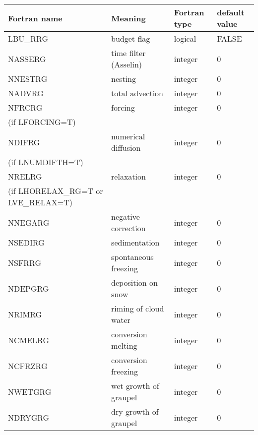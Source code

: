 \begin{center}
\begin{tabular} {|p{8cm}|p{4cm}|>{\centering}p{1.5cm}|p{1.5cm}<{\centering}|}
\hline
Fortran name & Meaning & Fortran type & default value \\
\hline\hline
LBU\_RRG & budget flag & logical & FALSE\index{LBU\_RRG!\innam{NAM\_BU\_RRG}} \\\hline
NASSERG  & time filter (Asselin)   & integer  &  0 \index{NASSERG!\innam{NAM\_BU\_RRG}} \\\hline
NNESTRG  & nesting           & integer  &  0 \index{NNESTRG!\innam{NAM\_BU\_RRG}} \\\hline
NADVRG   & total advection   & integer  &  0 \index{NADVRG!\innam{NAM\_BU\_RRG}}\\\hline
NFRCRG   & forcing           & integer  &  0 \index{NFRCRG!\innam{NAM\_BU\_RRG}} \\
(if LFORCING=T) &  &   &   \\\hline
NDIFRG   & numerical diffusion & integer  &  0 \index{NDIFRG!\innam{NAM\_BU\_RRG}} \\
(if LNUMDIFTH=T) &  &   &   \\\hline
NRELRG   & relaxation        & integer  &  0 \index{NRELRG!\innam{NAM\_BU\_RRG}}\\
(if LHORELAX\_RG=T or LVE\_RELAX=T) &  &   &   \\\hline
NNEGARG  & negative correction & integer  &  0 \index{NNEGARG!\innam{NAM\_BU\_RRG}}\\\hline
NSEDIRG  & sedimentation     & integer  &  0 \index{NSEDIRG!\innam{NAM\_BU\_RRG}}\\\hline
NSFRRG  & spontaneous freezing & integer  &  0 \index{NSFRRG!\innam{NAM\_BU\_RRS}}\\\hline
NDEPGRG  & deposition on snow & integer  &  0 \index{NDEPGRG!\innam{NAM\_BU\_RRG}}\\\hline
NRIMRG   & riming of cloud water & integer  &  0 \index{NRIMRG!\innam{NAM\_BU\_RRG}}\\\hline
NCMELRG  & conversion melting  & integer  &  0 \index{NCMELRG!\innam{NAM\_BU\_RRG}}\\\hline
NCFRZRG  & conversion freezing & integer  &  0 \index{NCFRZRG!\innam{NAM\_BU\_RRG}}\\\hline
NWETGRG  & wet growth of graupel  & integer  &  0 \index{NWETGRG!\innam{NAM\_BU\_RRG}}\\\hline
NDRYGRG  & dry growth of graupel  & integer  &  0 \index{NDRYGRG!\innam{NAM\_BU\_RRG}}\\\hline

\end{tabular}
\end{center}

